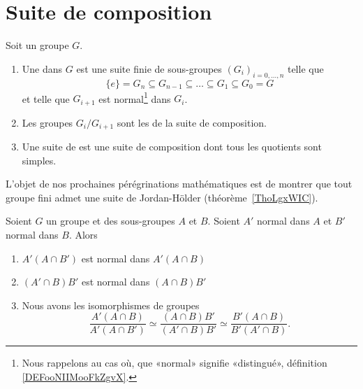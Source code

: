 


\section{Suite de composition}


\begin{definition}  \label{DefJWZSooNcntfK}
	Soit un groupe \( G\).
	\begin{enumerate}
		\item
		      Une  dans \( G\) est une suite finie de sous-groupes \( (G_i)_{i=0,\ldots, n}\) telle que
		      \begin{equation}
			      \{ e \}=G_n\subseteq G_{n-1}\subseteq\ldots\subseteq G_1\subseteq G_0=G
		      \end{equation}
		      et telle que \( G_{i+1}\) est normal\footnote{Nous rappelons au cas où, que «normal» signifie «distingué», définition \ref{DEFooNIIMooFkZgvX}.} dans \( G_i\).
		\item
		      Les groupes \( G_i/G_{i+1}\) sont les  de la suite de composition.
		\item
		      Une suite de  est une suite de composition dont tous les quotients sont simples.
	\end{enumerate}
\end{definition}
L'objet de nos prochaines pérégrinations mathématiques est de montrer que tout groupe fini admet une suite de Jordan-Hölder (théorème~\ref{ThoLgxWIC}).

\begin{lemma}\label{LemsKpXCG}
	Soient \( G\) un groupe et des sous-groupes \( A\) et \( B\). Soient \( A'\) normal dans \( A\) et \( B'\) normal dans \( B\). Alors
	\begin{enumerate}
		\item
		      \( A'(A\cap B')\) est normal dans \( A'(A\cap B)\)
		\item
		      \( (A'\cap B)B'\) est normal dans \( (A\cap B)B'\)
		\item
		      Nous avons les isomorphismes de groupes
		      \begin{equation}
			      \frac{ A'(A\cap B) }{ A'(A\cap B') }\simeq\frac{ (A\cap B)B' }{ (A'\cap B)B' }\simeq\frac{ B'(A\cap B) }{ B'(A'\cap B) }.
		      \end{equation}
	\end{enumerate}
\end{lemma}


